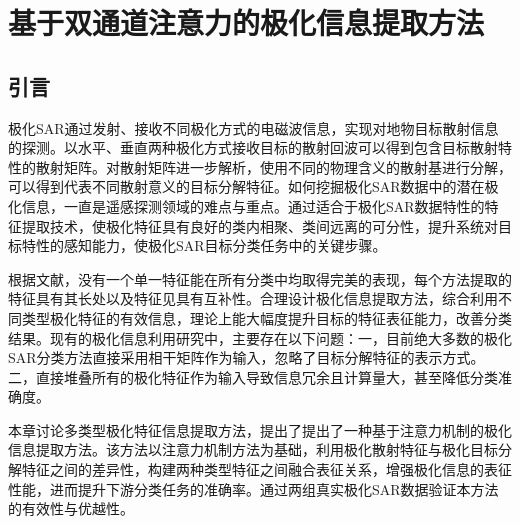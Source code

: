 \chapter{基于双通道注意力的极化信息提取方法}
\section{引言}
极化SAR通过发射、接收不同极化方式的电磁波信息，实现对地物目标散射信息的探测。以水平、垂直两种极化方式接收目标的散射回波可以得到包含目标散射特性的散射矩阵。对散射矩阵进一步解析，使用不同的物理含义的散射基进行分解，可以得到代表不同散射意义的目标分解特征。如何挖掘极化SAR数据中的潜在极化信息，一直是遥感探测领域的难点与重点。通过适合于极化SAR数据特性的特征提取技术，使极化特征具有良好的类内相聚、类间远离的可分性，提升系统对目标特性的感知能力，使极化SAR目标分类任务中的关键步骤。

根据文献\cite{刘高峰2014极化,1017062722.nh}，没有一个单一特征能在所有分类中均取得完美的表现，每个方法提取的特征具有其长处以及特征见具有互补性。合理设计极化信息提取方法，综合利用不同类型极化特征的有效信息，理论上能大幅度提升目标的特征表征能力，改善分类结果。现有的极化信息利用研究中，主要存在以下问题：一，目前绝大多数的极化SAR分类方法直接采用相干矩阵作为输入，忽略了目标分解特征的表示方式。二，直接堆叠所有的极化特征作为输入导致信息冗余且计算量大，甚至降低分类准确度。

本章讨论多类型极化特征信息提取方法，提出了提出了一种基于注意力机制的极化信息提取方法。该方法以注意力机制方法为基础，利用极化散射特征与极化目标分解特征之间的差异性，构建两种类型特征之间融合表征关系，增强极化信息的表征性能，进而提升下游分类任务的准确率。通过两组真实极化SAR数据验证本方法的有效性与优越性。




